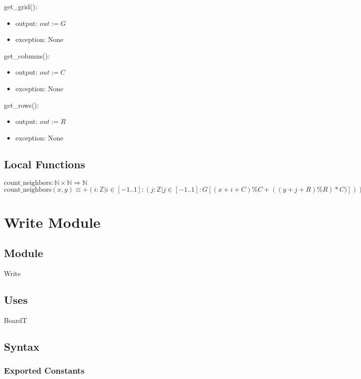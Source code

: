 \documentclass[12pt]{article}
\begin{document}
\noindent get\_grid():
\begin{itemize}
\item output: $out := G$
\item exception: None
\end{itemize}


\noindent get\_columns():
\begin{itemize}
\item output: $out := C$
\item exception: None
\end{itemize}


\noindent get\_rows():
\begin{itemize}
\item output: $out := R$
\item exception: None
\end{itemize}


\subsection*{Local Functions}

\noindent $\text{count\_neighbors}: \mathbb{N} \times \mathbb{N} \Rightarrow \mathbb{N}$\\
\noindent $\text{count\_neighbors}(x, y) \equiv +(i : \mathbb{Z} | i \in [-1..1] : (j : \mathbb{Z} |j \in [-1..1] : G[(x+i+C)\%C +((y+j+R)\%R)*C)])) - G[x + y * C]$\\


\newpage

\section* {Write Module}

\subsection* {Module}

Write

\subsection* {Uses}

BoardT

\subsection* {Syntax}

\subsubsection* {Exported Constants}
\end{document}
